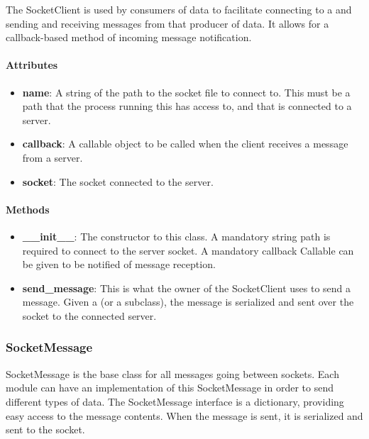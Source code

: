 \documentclass[titlepage]{article}
\begin{document}
The SocketClient is used by consumers of data to facilitate connecting to a
 and sending and receiving messages from that
producer of data.  It allows for a callback-based method of incoming message
notification.

\paragraph{Attributes}
\begin{itemize}
    \item \textbf{name}: A string of the path to the socket file to connect to.  This
        must be a path that the process running this has access to, and that is
        connected to a server.
    \item \textbf{callback}: A callable object to be called when the client receives a
        message from a server.
    \item \textbf{socket}: The socket connected to the server.
\end{itemize}

\paragraph{Methods}
\begin{itemize}
    \item \textbf{\_\_init\_\_}: The constructor to this class.  A mandatory
        string path is required to connect to the server socket.  A mandatory
        callback Callable can be given to be notified of message reception.
    \item \textbf{send\_message}: This is what the owner of the SocketClient
        uses to send a message.  Given a  (or a
        subclass), the message is serialized and sent over the socket to the
        connected server.
\end{itemize}


\subsubsection{SocketMessage
    \label{class-socket-message}
}

SocketMessage is the base class for all messages going between sockets.  Each
module can have an implementation of this SocketMessage in order to send
different types of data.  The SocketMessage interface is a dictionary,
providing easy access to the message contents.  When the message is sent, it is
serialized and sent to the socket.
\end{document}
